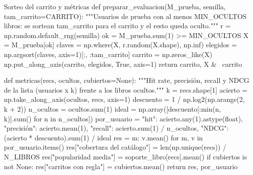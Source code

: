 \documentclass[11pt,letterpaper]{article}
\begin{document}
\begin{codigo}[label=cod:eval]{Sorteo del carrito y métricas}
def preparar_evaluacion(M_prueba, semilla, tam_carrito=CARRITO):
    """Usuarios de prueba con al menos MIN_OCULTOS libros: se sortean tam_carrito para el carrito y el resto queda oculto."""
    r = np.random.default_rng(semilla)
    ok = M_prueba.sum(1) >= MIN_OCULTOS
    X = M_prueba[ok]
    claves = np.where(X, r.random(X.shape), np.inf)
    elegidos = np.argsort(claves, axis=1)[:, :tam_carrito]
    carrito = np.zeros_like(X)
    np.put_along_axis(carrito, elegidos, True, axis=1)
    return carrito, X & ~carrito


def metricas(recs, ocultos, cubiertos=None):
    """Hit rate, precisión, recall y NDCG de la lista (usuarios x k) frente a los libros ocultos."""
    k = recs.shape[1]
    acierto = np.take_along_axis(ocultos, recs, axis=1)
    descuento = 1 / np.log2(np.arange(2, k + 2))
    n_ocultos = ocultos.sum(1)
    ideal = np.array([descuento[:min(n, k)].sum() for n in n_ocultos])
    por_usuario = {"hit": acierto.any(1).astype(float), "precisión": acierto.mean(1), "recall": acierto.sum(1) / n_ocultos,
                   "NDCG": (acierto * descuento).sum(1) / ideal}
    res = {m: v.mean() for m, v in por_usuario.items()}
    res["cobertura del catálogo"] = len(np.unique(recs)) / N_LIBROS
    res["popularidad media"] = soporte_libro[recs].mean()
    if cubiertos is not None:
        res["carritos con regla"] = cubiertos.mean()
    return res, por_usuario
\end{codigo}
\end{document}
